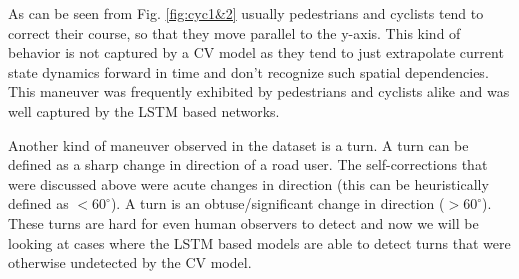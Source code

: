 \documentclass{article}
\begin{document}
As can be seen from Fig. \ref{fig:cyc1&2} usually pedestrians and cyclists tend to correct their course, so that they move parallel to the y-axis. This kind of behavior is not captured by a CV model as they tend to just extrapolate current state dynamics forward in time and don't recognize such spatial dependencies. This maneuver was frequently exhibited by pedestrians and cyclists alike and was well captured by the LSTM based networks. 

Another kind of maneuver observed in the dataset is a turn. A turn can be defined as a sharp change in direction of a road user. The self-corrections that were discussed above were acute changes in direction (this can be heuristically defined as $<60^{\circ}$). A turn is an obtuse/significant change in direction ($>60^{\circ}$). These turns are hard for even human observers to detect and now we will be looking at cases where the LSTM based models are able to detect turns that were otherwise undetected by the CV model. 
\end{document}
